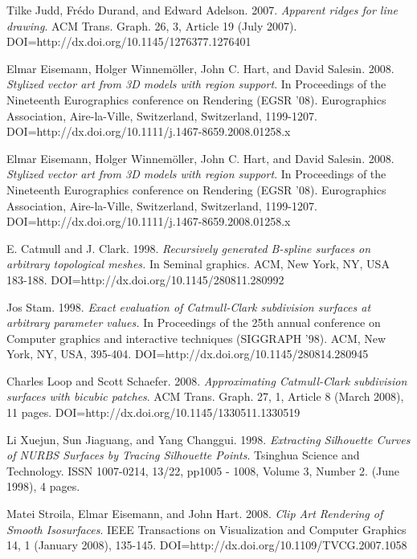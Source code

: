 \documentclass[12pt, letterpaper]{article}
\begin{document}
\begin{thebibliography}{9}

Tilke Judd, Frédo Durand, and Edward Adelson. 2007. 
\emph{Apparent ridges for line drawing}. ACM Trans. Graph. 26, 3, Article 19 (July 2007). DOI=http://dx.doi.org/10.1145/1276377.1276401

Elmar Eisemann, Holger Winnemöller, John C. Hart, and David Salesin. 2008.
\emph{Stylized vector art from 3D models with region support}. In Proceedings of the Nineteenth Eurographics conference on Rendering (EGSR '08). Eurographics Association, Aire-la-Ville, Switzerland, Switzerland, 1199-1207. DOI=http://dx.doi.org/10.1111/j.1467-8659.2008.01258.x

Elmar Eisemann, Holger Winnemöller, John C. Hart, and David Salesin. 2008.
\emph{Stylized vector art from 3D models with region support}. In Proceedings of the Nineteenth Eurographics conference on Rendering (EGSR '08). Eurographics Association, Aire-la-Ville, Switzerland, Switzerland, 1199-1207. DOI=http://dx.doi.org/10.1111/j.1467-8659.2008.01258.x

E. Catmull and J. Clark. 1998. \emph{Recursively generated B-spline surfaces on arbitrary topological meshes.}
In Seminal graphics. ACM, New York, NY, USA 183-188. DOI=http://dx.doi.org/10.1145/280811.280992

Jos Stam. 1998. 
\emph{Exact evaluation of Catmull-Clark subdivision surfaces at arbitrary parameter values.}
In Proceedings of the 25th annual conference on Computer graphics and interactive techniques (SIGGRAPH '98). ACM, New York, NY, USA, 395-404. DOI=http://dx.doi.org/10.1145/280814.280945

Charles Loop and Scott Schaefer. 2008.
\emph{Approximating Catmull-Clark subdivision surfaces with bicubic patches}.
ACM Trans. Graph. 27, 1, Article 8 (March 2008), 11 pages. DOI=http://dx.doi.org/10.1145/1330511.1330519

Li Xuejun, Sun Jiaguang, and Yang Changgui. 1998.
\emph{Extracting Silhouette Curves of NURBS Surfaces by Tracing Silhouette Points}.
Tsinghua Science and Technology. ISSN 1007-0214, 13/22, pp1005 - 1008, Volume 3, Number 2. (June 1998), 4 pages.

Matei Stroila, Elmar Eisemann, and John Hart. 2008.
\emph{Clip Art Rendering of Smooth Isosurfaces}.
IEEE Transactions on Visualization and Computer Graphics 14, 1 (January 2008), 135-145. DOI=http://dx.doi.org/10.1109/TVCG.2007.1058


\end{thebibliography}
\end{document}
